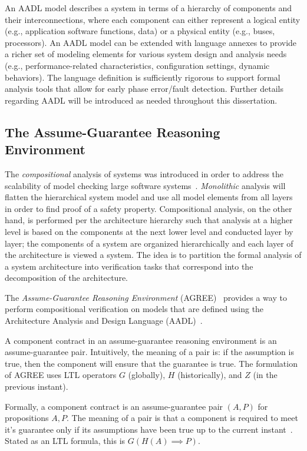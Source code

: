 An AADL model describes a system in terms of a hierarchy of components and their interconnections, where each component can either represent a logical entity (e.g., application software functions, data) or a physical entity (e.g., buses, processors). An AADL model can be extended with language annexes to provide a richer set of modeling elements for various system design and analysis needs (e.g., performance-related characteristics, configuration settings, dynamic behaviors). The language definition is sufficiently rigorous to support formal analysis tools that allow for early phase error/fault detection. Further details regarding AADL will be introduced as needed throughout this dissertation. 

\subsection{The Assume-Guarantee Reasoning Environment}
The {\em compositional} analysis of systems was introduced in order to address the scalability of model checking large software systems~\cite{pnueli1985transition, heckel1998compositional, NFM2012:CoGaMiWhLaLu}. {\em Monolithic} analysis will flatten the hierarchical system model and use all model elements from all layers in order to find proof of a safety property. Compositional analysis, on the other hand, is performed per the architecture hierarchy such that analysis at a higher level is based on the components at the next lower level and conducted layer by layer; the components of a system are organized hierarchically and each layer of the architecture is viewed a system. The idea is to partition the formal analysis of a system architecture into verification tasks that correspond into the decomposition of the architecture. 

The {\em Assume-Guarantee Reasoning Environment} (AGREE)~\cite{cofer2012compositional} provides a way to perform compositional verification on models that are defined using the Architecture Analysis and Design Language (AADL)~\cite{aerospace2012sae}. 

A component contract in an assume-guarantee reasoning environment is an assume-guarantee pair. Intuitively, the meaning of a pair is: if the assumption is true, then the component will ensure that the guarantee is true. The formulation of AGREE uses LTL operators $G$ (globally), $H$ (historically), and $Z$ (in the previous instant).

Formally, a component contract is an assume-guarantee pair $(A,P)$ for propositions $A, P$. The meaning of a pair is that a component is required to meet it's guarantee only if its assumptions have been true up to the current instant~\cite{cofer2012compositional}. Stated as an LTL formula, this is $G(H(A) \implies P)$. 

